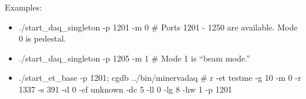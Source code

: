 Examples:
\begin{itemize}
\item ./start\_daq\_singleton -p 1201 -m 0   \# Ports 1201 - 1250 are available. Mode 0 is pedestal.
\item ./start\_daq\_singleton -p 1205 -m 1   \# Mode 1 is ``beam mode.''
\item ./start\_et\_base -p 1201; cgdb ../bin/minervadaq  \# r -et testme -g 10 -m 0 -r 1337 -s 391 -d 0 -cf unknown -dc 5 -ll 0 -lg 8 -hw 1 -p 1201
\end{itemize}







